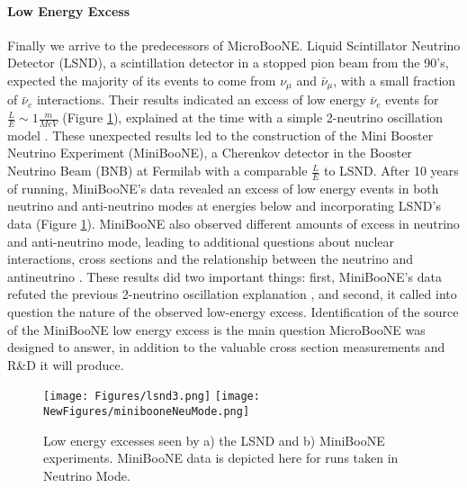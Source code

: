 \documentclass[12pt]{article}
\begin{document}
\paragraph{Low Energy Excess} %
Finally we arrive to the predecessors of MicroBooNE. Liquid Scintillator Neutrino Detector (LSND), a scintillation detector in a stopped pion beam from the 90's, expected the majority of its events to come from $\nu_\mu$ and $\bar{\nu}_\mu$, with a small fraction of $\bar{\nu}_e$ interactions. Their results indicated an excess of low energy $\bar{\nu}_e$ events for $\frac{L}{E} \sim 1 \frac{m}{MeV}$ (Figure \ref{fig:lsnd}), explained at the time with a simple 2-neutrino oscillation model \cite{lsnd}. These unexpected results led to the construction of the Mini Booster Neutrino Experiment (MiniBooNE), a Cherenkov detector in the Booster Neutrino Beam (BNB) at Fermilab with a comparable $\frac{L}{E}$ to LSND. After 10 years of running, MiniBooNE's data revealed an excess of low energy events in both neutrino and anti-neutrino modes at energies below and incorporating LSND's data (Figure \ref{fig:lsnd}).  MiniBooNE also observed different amounts of excess in neutrino and anti-neutrino mode, leading to additional questions about nuclear interactions, cross sections and the relationship between the neutrino and antineutrino \cite{miniboone}.  These results did two important things: first, MiniBooNE's data refuted the previous 2-neutrino oscillation explanation \cite{miniboone}, and second, it called into question the nature of the observed low-energy excess. Identification of the source of the MiniBooNE low energy excess is the main question MicroBooNE was designed to answer, in addition to the valuable cross section measurements and R\&D it will produce. 
\begin{figure}[h!]
\centering
\texttt{[image: Figures/lsnd3.png]}
\hspace{1.5 mm}
\texttt{[image: NewFigures/minibooneNeuMode.png]}
\caption{Low energy excesses seen by a) the LSND and b) MiniBooNE experiments.  MiniBooNE data is depicted here for runs taken in Neutrino Mode.}
\label{fig:lsnd}
\end{figure}
\end{document}
